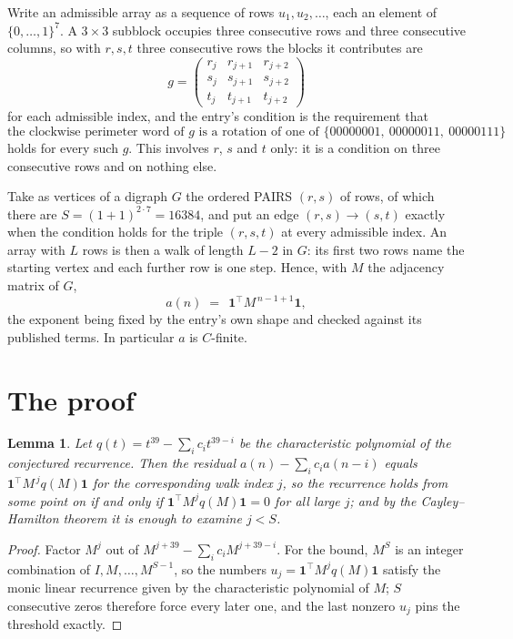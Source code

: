 \documentclass[11pt,a4paper]{article}
\theoremstyle{plain}
\newtheorem{lemma}[theorem]{Lemma}
\theoremstyle{definition}
\begin{document}
Write an admissible array as a sequence of rows $u_1,u_2,\dots$, each an element of
$\{0,\dots,1\}^{7}$. A $3\times3$ subblock occupies three consecutive rows and
three consecutive columns, so with $r,s,t$ three consecutive rows the blocks it
contributes are
\[
g=\begin{pmatrix}r_j&r_{j+1}&r_{j+2}\\ s_j&s_{j+1}&s_{j+2}\\ t_j&t_{j+1}&t_{j+2}\end{pmatrix}
\]
for each admissible index, and the entry's condition is the requirement that
\[
\text{the clockwise perimeter word of }g\text{ is a rotation of one of }\{00000001,\ 00000011,\ 00000111\}
\]
holds for every such $g$. This involves $r$, $s$ and $t$ only: it is a condition on
three consecutive rows and on nothing else.

Take as vertices of a digraph $G$ the ordered PAIRS $(r,s)$ of rows, of which there are
$S=(1+1)^{2\cdot7}=16384$, and put an edge $(r,s)\to(s,t)$ exactly when the condition
holds for the triple $(r,s,t)$ at every admissible index. An array with $L$ rows is then a
walk of length $L-2$ in $G$: its first two rows name the starting vertex and each further
row is one step. Hence, with $M$ the adjacency matrix of $G$,
\[
a(n)\;=\;\,\mathbf{1}^{\!\top}M^{\,n-1+1}\mathbf{1},
\]
the exponent being fixed by the entry's own shape and checked against its published terms.
In particular $a$ is $C$-finite.

\section{The proof}

\begin{lemma}\label{lem:crit}
Let $q(t)=t^{39}-\sum_i c_it^{39-i}$ be the characteristic polynomial of the
conjectured recurrence. Then the residual $a(n)-\sum_ic_ia(n-i)$ equals
$\mathbf{1}^{\!\top}M^{\,j}q(M)\mathbf{1}$ for the corresponding walk index
$j$, so the recurrence holds from some point on if and only if
$\mathbf{1}^{\!\top}M^{j}q(M)\mathbf{1}=0$ for all large $j$; and by the
Cayley--Hamilton theorem it is enough to examine $j<S$.
\end{lemma}

\begin{proof}
Factor $M^{j}$ out of $M^{j+39}-\sum_ic_iM^{j+39-i}$. For the bound, $M^{S}$
is an integer combination of $I,M,\dots,M^{S-1}$, so the numbers
$u_j=\mathbf{1}^{\!\top}M^{j}q(M)\mathbf{1}$ satisfy the monic linear recurrence given by
the characteristic polynomial of $M$; $S$ consecutive zeros therefore force every later one,
and the last nonzero $u_j$ pins the threshold exactly.
\end{proof}
\end{document}
